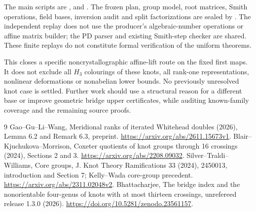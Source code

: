 \documentclass[11pt]{article}
\begin{document}
The main scripts are ,
 and
. The frozen plan, group model,
root matrices, Smith operations, field bases, inversion audit and
split factorizations are sealed by
. The independent replay
does not use the producer's algebraic-number operations or affine
matrix builder; the PD parser and existing Smith-step checker are
shared. These finite replays do not constitute formal verification
of the uniform theorems.

This closes a specific noncrystallographic affine-lift route on the
fixed first maps. It does not exclude all $H_3$ colourings of these
knots, all rank-one representations, nonlinear deformations or
nonabelian lower bounds. No previously unresolved knot case is
settled. Further work should use a structural reason for a different
base or improve geometric bridge upper certificates, while auditing
known-family coverage and the remaining source proofs.

\begin{thebibliography}{9}
 Gao--Gu--Li--Wang, Meridional ranks of iterated
Whitehead doubles (2026), Lemma 6.2 and Remark 6.3, preprint.
\url{https://arxiv.org/abs/2611.15673v1}.
 Blair--Kjuchukova--Morrison, Coxeter quotients of knot
groups through 16 crossings (2024), Sections 2 and 3.
\url{https://arxiv.org/abs/2208.09032}.
 Silver--Traldi--Williams, Core groups,
J. Knot Theory Ramifications 33 (2024), 2450013, introduction and
Section 7; Kelly--Wada core-group precedent.
\url{https://arxiv.org/abs/2311.02048v2}.
 Bhattacharjee, The bridge index and the nonorientable
four-genus of knots with at most thirteen crossings, unrefereed
release 1.3.0 (2026). \url{https://doi.org/10.5281/zenodo.23561157}.
\end{thebibliography}
\end{document}
